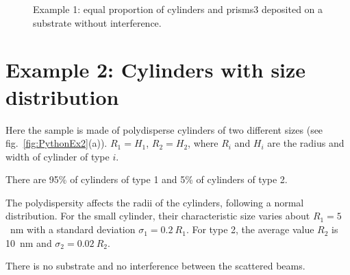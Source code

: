 \begin{figure}[H]
\hfill
{}
\hfill
{}
\hfill
\caption{Example 1: equal proportion of cylinders and prisms3 deposited on a substrate without interference.}
\label{fig:PythonEx1}
\end{figure}

\newpage
\section{Example 2: Cylinders with size distribution} 
Here the sample is made of polydisperse cylinders of two different sizes (see fig.~\ref{fig:PythonEx2}(a)). $R_1=H_1$, $R_2=H_2$, where $R_i$ and $H_i$ are the radius and width of cylinder of type $i$.  

There are 95\% of cylinders of type 1 and 5\% of cylinders of type 2.

The polydispersity affects the radii of the cylinders, following a normal distribution. For the small cylinder, their characteristic size varies about $R_1=5$~nm with a standard deviation $\sigma_1=0.2\ R_1$. For type 2, the average value $R_2$ is 10~nm and $\sigma_2=0.02\ R_2$. 

There is no substrate and no interference between the scattered beams.

